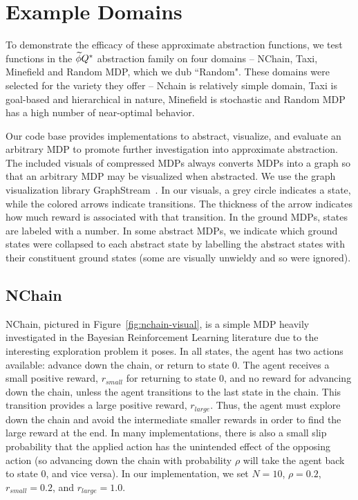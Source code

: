 \section{Example Domains}
To demonstrate the efficacy of these approximate abstraction functions, we test functions in the $\widetilde \phi{Q^*}$ abstraction family on four domains -- NChain, Taxi, Minefield and Random MDP, which we dub ``Random". These domains were selected for the variety they offer -- Nchain is relatively simple domain, Taxi is goal-based and hierarchical in nature, Minefield is stochastic and Random MDP has a high number of near-optimal behavior.

Our code base provides implementations to abstract, visualize, and evaluate an arbitrary MDP to promote further investigation into approximate abstraction. The included visuals of compressed MDPs always converts MDPs into a graph so that an arbitrary MDP may be visualized when abstracted. We use the graph visualization library GraphStream~\cite{graphstream}. In our visuals, a grey circle indicates a state, while the colored arrows indicate transitions. The thickness of the arrow indicates how much reward is associated with that transition. In the ground MDPs, states are labeled with a number. In some abstract MDPs, we indicate which ground states were collapsed to each abstract state by labelling the abstract states with their constituent ground states (some are visually unwieldy and so were ignored).

\subsection{NChain}

NChain, pictured in Figure~\ref{fig:nchain-visual}, is a simple MDP heavily investigated in the Bayesian Reinforcement Learning literature due to the interesting exploration problem it poses. In all states, the agent has two actions available: advance down the chain, or return to state 0. The agent receives a small positive reward, $r_{small}$ for returning to state 0, and no reward for advancing down the chain, unless the agent transitions to the last state in the chain. This transition provides a large positive reward, $r_{large}$. Thus, the agent must explore down the chain and avoid the intermediate smaller rewards in order to find the large reward at the end. In many implementations, there is also a small slip probability that the applied action has the unintended effect of the opposing action (so advancing down the chain with probability $\rho$ will take the agent back to state 0, and vice versa). In our implementation, we set $N=10$, $\rho=0.2$, $r_{small} = 0.2$, and $r_{large} = 1.0$.

